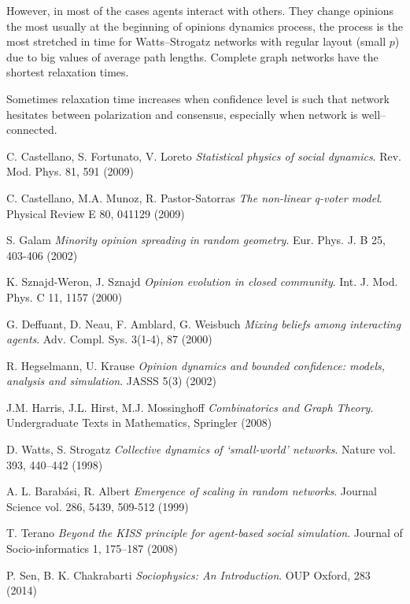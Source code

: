 \documentclass[a4paper, 12pt]{article}
\begin{document}
However, in most of the cases agents interact with others. They change opinions the most usually at the beginning of opinions dynamics process, the process is the most stretched in time for Watts--Strogatz networks with regular layout (small $p$) due to big values of average path lengths. Complete graph networks have the shortest relaxation times.

Sometimes relaxation time increases when confidence level is such that network hesitates between polarization and consensus, especially when network is well--connected.

\newpage

\begin{thebibliography}{90}

C. Castellano, S. Fortunato, V. Loreto 
	\emph{Statistical physics of social dynamics}. Rev. Mod. Phys. 81, 591 (2009)

C. Castellano, M.A. Munoz, R. Pastor-Satorras
  \emph{The non-linear q-voter model}.  
Physical Review E 80, 041129 (2009)

S. Galam
	\emph{Minority opinion spreading in random geometry}.
Eur. Phys. J. B 25, 403-406 (2002)

K. Sznajd-Weron, J. Sznajd
	\emph{Opinion evolution in closed community}. Int. J. Mod. Phys. C 11, 1157 (2000)
	
G. Deffuant, D. Neau, F. Amblard, G. Weisbuch
	\emph{Mixing beliefs among interacting agents}. Adv. Compl. Sys. 3(1-4), 87 (2000)
	
R. Hegselmann, U. Krause
	\emph{Opinion dynamics and bounded confidence: models, analysis and simulation}. JASSS 5(3) (2002)

J.M. Harris, J.L. Hirst, M.J. Mossinghoff
	\emph{Combinatorics and Graph Theory}.
Undergraduate Texts in Mathematics, Springler (2008)

D. Watts, S. Strogatz
	\emph{Collective dynamics of ‘small-world’ networks}.
Nature vol. 393, 440–442 (1998)

A. L. Barabási, R. Albert
	\emph{Emergence of scaling in random networks}.
Journal Science vol. 286, 5439, 509-512 (1999)

T. Terano
	\emph{Beyond the KISS principle for agent-based social simulation}. Journal of
Socio-informatics 1, 175–187 (2008)

P. Sen, B. K. Chakrabarti
	\emph{Sociophysics: An Introduction}.
OUP Oxford, 283 (2014)


\end{thebibliography}
\end{document}
